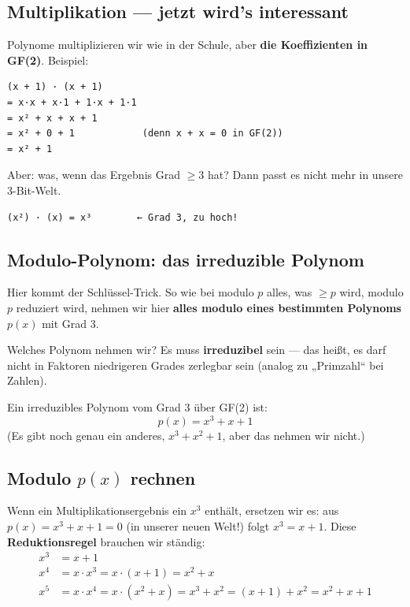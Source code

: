 \subsection*{Multiplikation — jetzt wird's interessant}

Polynome multiplizieren wir wie in der Schule, aber \textbf{die
Koeffizienten in GF(2)}. Beispiel:

\begin{verbatim}
(x + 1) · (x + 1)
= x·x + x·1 + 1·x + 1·1
= x² + x + x + 1
= x² + 0 + 1            (denn x + x = 0 in GF(2))
= x² + 1
\end{verbatim}

Aber: was, wenn das Ergebnis Grad $\ge 3$ hat? Dann passt es nicht
mehr in unsere 3-Bit-Welt.

\begin{verbatim}
(x²) · (x) = x³        ← Grad 3, zu hoch!
\end{verbatim}

\subsection*{Modulo-Polynom: das irreduzible Polynom}

Hier kommt der Schlüssel-Trick. So wie bei modulo $p$ alles, was
$\ge p$ wird, modulo $p$ reduziert wird, nehmen wir hier
\textbf{alles modulo eines bestimmten Polynoms} $p(x)$ mit Grad 3.

Welches Polynom nehmen wir? Es muss \textbf{irreduzibel} sein — das
heißt, es darf nicht in Faktoren niedrigeren Grades zerlegbar sein
(analog zu „Primzahl“ bei Zahlen).

Ein irreduzibles Polynom vom Grad 3 über GF(2) ist:
\[
  p(x) = x^3 + x + 1
\]
(Es gibt noch genau ein anderes, $x^3 + x^2 + 1$, aber das nehmen
wir nicht.)

\subsection*{Modulo $p(x)$ rechnen}

Wenn ein Multiplikationsergebnis ein $x^3$ enthält, ersetzen wir es:
aus $p(x) = x^3 + x + 1 = 0$ (in unserer neuen Welt!) folgt
$x^3 = x + 1$. Diese \textbf{Reduktionsregel} brauchen wir ständig:
\begin{align*}
  x^3  &=  x + 1 \\
  x^4  &=  x \cdot x^3 = x \cdot (x + 1) = x^2 + x \\
  x^5  &=  x \cdot x^4 = x \cdot (x^2 + x) = x^3 + x^2 = (x+1) + x^2 = x^2 + x + 1
\end{align*}


